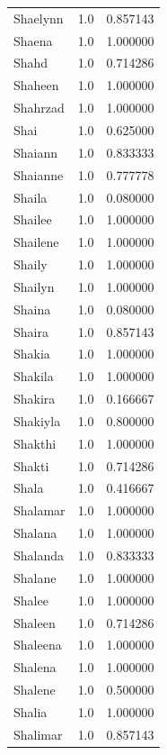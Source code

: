 \documentclass[
  letterpaper,
  DIV=11,
  numbers=noendperiod]{scrreprt}
\begin{document}
\begin{tabular}{lrr}
Shaelynn        &   1.0 &   0.857143 \\
Shaena          &   1.0 &   1.000000 \\
Shahd           &   1.0 &   0.714286 \\
Shaheen         &   1.0 &   1.000000 \\
Shahrzad        &   1.0 &   1.000000 \\
Shai            &   1.0 &   0.625000 \\
Shaiann         &   1.0 &   0.833333 \\
Shaianne        &   1.0 &   0.777778 \\
Shaila          &   1.0 &   0.080000 \\
Shailee         &   1.0 &   1.000000 \\
Shailene        &   1.0 &   1.000000 \\
Shaily          &   1.0 &   1.000000 \\
Shailyn         &   1.0 &   1.000000 \\
Shaina          &   1.0 &   0.080000 \\
Shaira          &   1.0 &   0.857143 \\
Shakia          &   1.0 &   1.000000 \\
Shakila         &   1.0 &   1.000000 \\
Shakira         &   1.0 &   0.166667 \\
Shakiyla        &   1.0 &   0.800000 \\
Shakthi         &   1.0 &   1.000000 \\
Shakti          &   1.0 &   0.714286 \\
Shala           &   1.0 &   0.416667 \\
Shalamar        &   1.0 &   1.000000 \\
Shalana         &   1.0 &   1.000000 \\
Shalanda        &   1.0 &   0.833333 \\
Shalane         &   1.0 &   1.000000 \\
Shalee          &   1.0 &   1.000000 \\
Shaleen         &   1.0 &   0.714286 \\
Shaleena        &   1.0 &   1.000000 \\
Shalena         &   1.0 &   1.000000 \\
Shalene         &   1.0 &   0.500000 \\
Shalia          &   1.0 &   1.000000 \\
Shalimar        &   1.0 &   0.857143 \\

\end{tabular}
\end{document}
